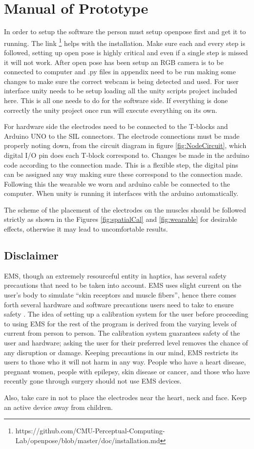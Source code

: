 \section{Manual of Prototype}

In order to setup the software the person must setup openpose first and get it to running. The link \footnote{https://github.com/CMU-Perceptual-Computing-Lab/openpose/blob/master/doc/installation.md} helps with the installation. Make sure each and every step is followed, setting up open pose is highly critical and even if a single step is missed it will not work. After open pose has been setup an RGB camera is to be connected to computer and .py files in appendix need to be run making some changes to make sure the correct webcam is being detected and used. For user interface unity needs to be setup loading all the unity scripts project included here. This is all one needs to do for the software side. If everything is done correctly the unity project once run will execute everything on its own. 

For hardware side the electrodes need to be connected to the T-blocks and Arduino UNO to the SIL connectors. The electrode connections must be made properly noting down, from the circuit diagram in figure \ref{fig:NodeCircuit}, which digital I/O pin does each T-block correspond to. Changes be made in the arduino code according to the connection made. This is a flexible step, the digital pins can be assigned any way making sure these correspond to the connection made. Following this the wearable we worn and arduino cable be connected to the computer. When unity is running it interfaces with the arduino automatically. 

The scheme of the placement of the electrodes on the muscles should be followed strictly as shown in the Figures \ref{fig:spatialCal} and \ref{fig:wearable} for desirable effects, otherwise it may lead to uncomfortable results.


\subsection{Disclaimer}
EMS, though an extremely resourceful entity in haptics, has several safety precautions that need to be taken into account. EMS uses slight current on the user’s body to simulate “skin receptors and muscle fibers”, hence there comes forth several hardware and software precautions users need to take to ensure safety \cite{toolkit}. The idea of setting up a calibration system for the user before proceeding to using EMS for the rest of the program is derived from the varying levels of current from person to person. The calibration system guarantees safety of the user and hardware; asking the user for their preferred level removes the chance of any disruption or damage. Keeping precautions in our mind, EMS restricts its users to those who it will not harm in any way. People who have a heart disease, pregnant women, people with epilepsy, skin disease or cancer, and those who have recently gone through surgery should not use EMS devices.

Also, take care in not to place the electrodes near the heart, neck and face. Keep an active device away from children.
